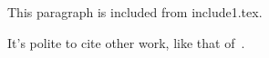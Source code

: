 This paragraph is included from include1.tex.

\mymacro{}



It's polite to cite other work, like that of~\cite{dummyref}.
